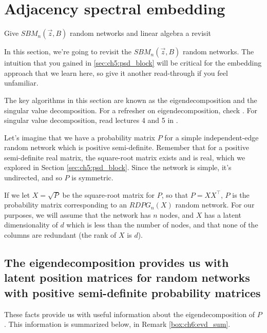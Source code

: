 \section{Adjacency spectral embedding}
\label{sec:ch6:ase}

\begin{floatingbox}[h]\caption{Give $SBM_n(\vec z, B)$ random networks and linear algebra a revisit}
In this section, we're going to revisit the $SBM_n(\vec z, B)$ random networks. The intuition that you gained in \ref{sec:ch5:psd_block} will be critical for the embedding approach that we learn here, so give it another read-through if you feel unfamiliar. 

The key algorithms in this section are known as the {eigendecomposition} and the {singular value decomposition}. For a refresher on eigendecomposition, check \cite{Axler}. For singular value decomposition, read lectures 4 and 5 in \cite{Trefethen1997}.
\end{floatingbox}

Let's imagine that we have a probability matrix $P$ for a simple independent-edge random network which is positive semi-definite. Remember that for a positive semi-definite real matrix, the square-root matrix exists and is real, which we explored in Section \ref{sec:ch5:psd_block}. Since the network is simple, it's undirected, and so $P$ is symmetric.

If we let $X = \sqrt{P}$ be the square-root matrix for $P$, so that $P = X X^\top$, $P$ is the probability matrix corresponding to an $RDPG_n(X)$ random network. For our purposes, we will assume that the network has $n$ nodes, and $X$ has a latent dimensionality of $d$ which is less than the number of nodes, and that none of the columns are redundant (the rank of $X$ is $d$).

\subsection{The eigendecomposition provides us with latent position matrices for random networks with positive semi-definite probability matrices}

These facts provide us with useful information about the eigendecomposition of $P$. This information is summarized below, in Remark \ref{box:ch6:evd_sum}.

